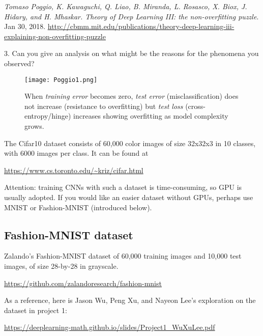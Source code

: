 \documentclass[11pt]{article}
\begin{document}
\emph{Tomaso Poggio, K. Kawaguchi, Q. Liao, B. Miranda, L. Rosasco, X. Biox, J. Hidary, and H. Mhaskar. Theory of Deep Learning III: the non-overfitting puzzle}. Jan 30, 2018. \url{http://cbmm.mit.edu/publications/theory-deep-learning-iii-explaining-non-overfitting-puzzle} 

3. Can you give an analysis on what might be the reasons for the phenomena you observed? 

\begin{figure}
\center
\texttt{[image: Poggio1.png]}  
\caption{When \emph{training error} becomes zero, \emph{test error} (misclassification) does not increase (resistance to overfitting) but \emph{test loss} (cross-entropy/hinge) increases showing overfitting as model complexity grows.}
\label{fig:Poggio1}
\end{figure}

The Cifar10 dataset consists of 60,000 color images of size 32x32x3 in 10 classes, with 6000 images per class. It can be found at 

\url{https://www.cs.toronto.edu/~kriz/cifar.html}

\noindent Attention: training CNNs with such a dataset is time-consuming, so GPU is usually adopted. If you would like an easier dataset without GPUs, perhaps use MNIST or Fashion-MNIST (introduced below).

\subsection{Fashion-MNIST dataset}

Zalando's Fashion-MNIST dataset of 60,000 training images and 10,000 test images, of size 28-by-28 in grayscale. 

\url{https://github.com/zalandoresearch/fashion-mnist}

As a reference, here is Jason Wu, Peng Xu, and Nayeon Lee's exploration on the dataset in project 1:

\url{https://deeplearning-math.github.io/slides/Project1_WuXuLee.pdf}
\end{document}
